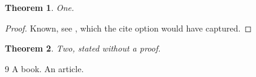\documentclass{article}
\newtheorem{theorem}{Theorem}
\begin{document}
\begin{theorem}\label{t1}One.\end{theorem}
\begin{proof}
  Known, see \cite{bk}, which the cite option would have captured.%
\end{proof}

\begin{theorem}\label{t2}Two, stated without a proof.\end{theorem}


\begin{thebibliography}{9}
A book.
An article.
\end{thebibliography}
\end{document}
